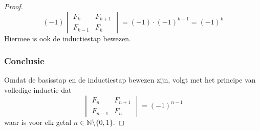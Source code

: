 \documentclass[lineaire_algebra_oplossingen.tex]{subfiles}
\begin{document}
\begin{proof}
\[
(-1)
\begin{vmatrix}
F_{k} & F_{k+1}\\
F_{k-1}   & F_{k}
\end{vmatrix}
= (-1)\cdot(-1)^{k-1}
= (-1)^{k}
\]
Hiermee is ook de inductiestap bewezen.

\subsubsection*{Conclusie}
Omdat de basisstap en de inductiestap bewezen zijn, volgt met het principe van volledige inductie dat
\[
\begin{vmatrix}
F_{n}   & F_{n+1}\\
F_{n-1} & F_{n}
\end{vmatrix}
=
(-1)^{n-1}
\]
waar is voor elk getal $n \in \mathbb{N}\setminus\{0,1\}$. 
\end{proof}
\end{document}
